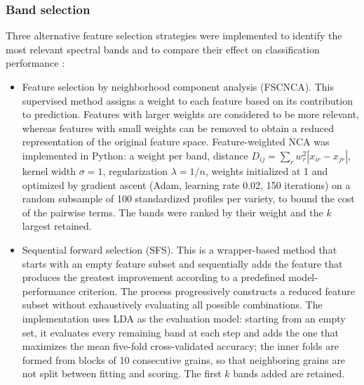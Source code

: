\documentclass[final,5p,times,twocolumn]{elsarticle}
\newcommand{\added}[1]{#1}
\begin{document}
\subsubsection{Band selection}\label{sec_feature_selection}

Three alternative feature selection strategies were implemented to identify the most relevant spectral bands and to compare their effect on classification performance \citep{Rahmani2022, Castro2022cafs}: 

\begin{itemize}
    \item[--] Feature selection by neighborhood component analysis (FSCNCA).
    This supervised method assigns a weight to each feature based on its contribution to prediction. 
    Features with larger weights are considered to be more relevant, whereas features with small weights can be removed to obtain a reduced representation of the original feature space.
    \added{Feature-weighted NCA \citep{Yang2012nca} was implemented in Python: a weight per band, distance $D_{ij}=\sum_r w_r^2|x_{ir}-x_{jr}|$, kernel width $\sigma=1$, regularization $\lambda=1/n$, weights initialized at 1 and optimized by gradient ascent (Adam, learning rate 0.02, 150 iterations) on a random subsample of 100 standardized profiles per variety, to bound the cost of the pairwise terms. The bands were ranked by their weight and the $k$ largest retained.}
    
    \item[--] Sequential forward selection (SFS).
    This is a wrapper-based method that starts with an empty feature subset and sequentially adds the feature that produces the greatest improvement according to a predefined model-performance criterion.
    The process progressively constructs a reduced feature subset without exhaustively evaluating all possible combinations. 
    The implementation uses LDA as the evaluation model: starting from an empty set, it evaluates every remaining band at each step and adds the one that maximizes the mean five-fold cross-validated accuracy; the inner folds are formed from blocks of 10 consecutive grains, so that neighboring grains are not split between fitting and scoring. The first $k$ bands added are retained.


\end{itemize}
\end{document}
